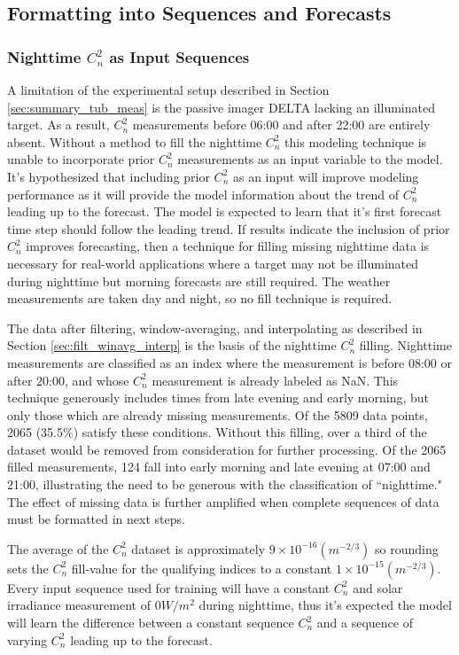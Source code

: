 \subsection{Formatting into Sequences and Forecasts}
\label{sec:format_sequence_forecast}
\subsubsection{Nighttime $C_{n}^{2}$ as Input Sequences}
A limitation of the experimental setup described in Section \ref{sec:summary_tub_meas} is the passive imager DELTA lacking an illuminated target. As a result, $C_{n}^{2}$ measurements before 06:00 and after 22:00 are entirely absent. Without a method to fill the nighttime $C_{n}^{2}$ this modeling technique is unable to incorporate prior $C_{n}^{2}$ measurements as an input variable to the model. It's hypothesized that including prior $C_{n}^{2}$ as an input will improve modeling performance as it will provide the model information about the trend of $C_{n}^{2}$ leading up to the forecast. The model is expected to learn that it's first forecast time step should follow the leading trend. If results indicate the inclusion of prior $C_{n}^{2}$ improves forecasting, then a technique for filling missing nighttime data is necessary for real-world applications where a target may not be illuminated during nighttime but morning forecasts are still required. The weather measurements are taken day and night, so no fill technique is required.

The data after filtering, window-averaging, and interpolating as described in Section \ref{sec:filt_winavg_interp} is the basis of the nighttime $C_{n}^{2}$ filling. Nighttime measurements are classified as an index where the measurement is before 08:00 or after 20:00, and whose $C_{n}^{2}$ measurement is already labeled as \ac{NaN}. This technique generously includes times from late evening and early morning, but only those which are already missing measurements. Of the 5809 data points, 2065 (35.5\%) satisfy these conditions. Without this filling, over a third of the dataset would be removed from consideration for further processing. Of the 2065 filled measurements, 124 fall into early morning and late evening at 07:00 and 21:00, illustrating the need to be generous with the classification of ``nighttime." The effect of missing data is further amplified when complete sequences of data must be formatted in next steps.

The average of the $C_{n}^{2}$ dataset is approximately $9 \times 10^{-16} (m^{-2/3})$ so rounding sets the $C_{n}^{2}$ fill-value for the qualifying indices to a constant $1 \times 10^{-15} (m^{-2/3})$. Every input sequence used for training will have a constant $C_{n}^{2}$ and solar irradiance measurement of $0 W/m^{2}$ during nighttime, thus it's expected the model will learn the difference between a constant sequence $C_{n}^{2}$ and a sequence of varying $C_{n}^{2}$ leading up to the forecast.

